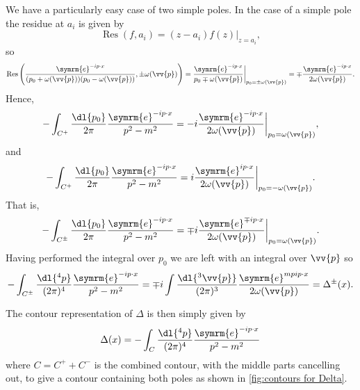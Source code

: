 \documentclass[fleqn]{NotesClass}
\newcommand{\e}{\symrm{e}}
\DeclareMathOperator{\Res}{Res}
\begin{document}
    We have a particularly easy case of two simple poles.
    In the case of a simple pole the residue at \(a_i\) is given by
    \begin{equation}
        \Res(f, a_i) = (z - a_i)f(z)|_{z = a_i},
    \end{equation}
    so
    \begin{equation}
        \Res\left( \frac{\e^{-ip\cdot x}}{(p_0 + \omega(\vv{p}))(p_0 - \omega(\vv{p}))}, \pm \omega(\vv{p}) \right) = \frac{\e^{-ip\cdot x}}{p_0 \mp \omega(\vv{p})} \bigg|_{p_0 = \pm \omega(\vv{p})} = \mp \frac{\e^{-ip\cdot x}}{2\omega(\vv{p})}.
    \end{equation}
    Hence,
    \begin{equation}
        -\int_{C^+} \frac{\dl{p_0}}{2\pi} \frac{\e^{-ip\cdot x}}{p^2 - m^2} = -i \frac{\e^{-ip\cdot x}}{2\omega(\vv{p})}\bigg|_{p_0 = \omega(\vv{p})},
    \end{equation}
    and
    \begin{equation}
        -\int_{C^+} \frac{\dl{p_0}}{2\pi} \frac{\e^{-ip\cdot x}}{p^2 - m^2} = i \frac{\e^{ip\cdot x}}{2\omega(\vv{p})}\bigg|_{p_0 = -\omega(\vv{p})}.
    \end{equation}
    That is,
    \begin{equation}
        -\int_{C^{\pm}} \frac{\dl{p_0}}{2\pi} \frac{\e^{-ip\cdot x}}{p^2 - m^2} = \mp i \frac{\e^{\mp ip\cdot x}}{2\omega(\vv{p})}\bigg|_{p_0 = \omega(\vv{p})}.
    \end{equation}
    Having performed the integral over \(p_0\) we are left with an integral over \(\vv{p}\) so
    \begin{equation}
        -\int_{C^{\pm}} \frac{\dl{^4p}}{(2\pi)^4} \frac{\e^{-ip\cdot x}}{p^2 - m^2} = \mp i \int \frac{\dl{^3\vv{p}}}{(2\pi)^3} \frac{\e^{mp ip \cdot x}}{2\omega(\vv{p})} = \Delta^{\pm}(x).
    \end{equation}
    
    The contour representation of \(\Delta\) is then simply given by
    \begin{equation}
        \Delta(x) = - \int_{C} \frac{\dl{^4p}}{(2\pi)^4} \frac{\e^{-ip\cdot x}}{p^2 - m^2}
    \end{equation}
    where \(C = C^+ + C^-\) is the combined contour, with the middle parts cancelling out, to give a contour containing both poles as shown in \cref{fig:contours for Delta}.
    
\end{document}
